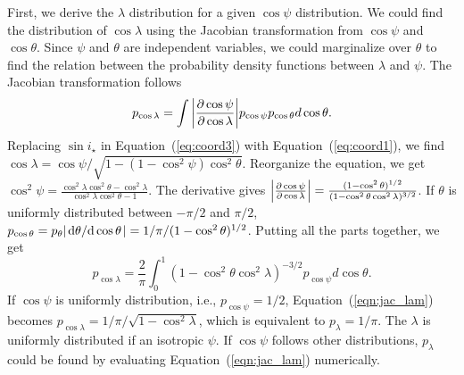 \documentclass[twocolumn,times]{aastex631}
\begin{document}
First, we derive the $\lambda$ distribution for a given $\cos{\psi}$ distribution. We could find the distribution of $\cos{\lambda}$ using the Jacobian transformation from $\cos{\psi}$ and $\cos{\theta}$. Since $\psi$ and $\theta$ are independent variables, we could marginalize over $\theta$ to find the relation between the probability density functions between $\lambda$ and $\psi$.
The Jacobian transformation follows
\begin{equation}
    p_{\cos{\lambda}} = \int \abs{\pdv{\cos{\psi}}{\cos{\lambda}}} p_{\cos{\psi}} p_{\cos{\theta}} d\cos{\theta}.
\end{equation}
Replacing $\sin{i_\star}$ in Equation~(\ref{eq:coord3}) with Equation~(\ref{eq:coord1}), we find $\cos{\lambda} = \cos{\psi}/\sqrt{1-(1-\cos^2{\psi})\cos^2{\theta}}$. Reorganize the equation, we get $\cos^2{\psi} = \frac{\cos^2{\lambda}\cos^2{\theta}-\cos^2{\lambda}}{\cos^2{\lambda}\cos^2{\theta}-1}$.
The derivative gives $\abs{\pdv{\cos{\psi}}{\cos{\lambda}}} = \frac{(1-\cos^2{\theta})^{1/2}}{(1-\cos^2{\theta}\cos^2{\lambda})^{3/2}}$. If $\theta$ is uniformly distributed between $-\pi/2$ and $\pi/2$, $p_{\cos{\theta}} = p_{\theta} \abs{\dv*{\theta}{\cos{\theta}}} = 1/\pi/(1-\cos^2{\theta)^{1/2}}$. Putting all the parts together, we get
\begin{equation}\label{eqn:jac_lam}
    p_{\cos{\lambda}} = \frac{2}{\pi} \int_{0}^{1} (1-\cos^2{\theta}\cos^2{\lambda})^{-3/2} p_{\cos{\psi}} d\cos{\theta}.
\end{equation}
If $\cos{\psi}$ is uniformly distribution, i.e., $p_{\cos{\psi}} = 1/2$, Equation~(\ref{eqn:jac_lam}) becomes $p_{\cos{\lambda}} = 1/\pi/\sqrt{1-\cos^2{\lambda}}$, which is equivalent to $p_\lambda = 1/\pi$. The $\lambda$ is uniformly distributed if an isotropic $\psi$. If $\cos{\psi}$ follows other distributions, $p_\lambda$ could be found by evaluating Equation~(\ref{eqn:jac_lam}) numerically.
\end{document}

